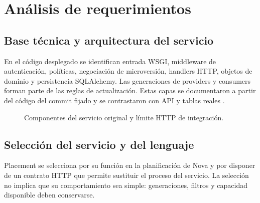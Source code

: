 \documentclass[12pt,a4paper]{article}
\begin{document}
\section{Análisis de requerimientos}
\subsection{Base técnica y arquitectura del servicio}
En el código desplegado se identifican entrada WSGI, middleware de autenticación, políticas, negociación de microversión, handlers HTTP, objetos de dominio y persistencia SQLAlchemy. Las generaciones de providers y consumers forman parte de las reglas de actualización. Estas capas se documentaron a partir del código del commit fijado y se contrastaron con API y tablas reales \cite{repo}.

\begin{figure}[ht]
\centering
{}
\caption{Componentes del servicio original y límite HTTP de integración.}
\end{figure}

\subsection{Selección del servicio y del lenguaje}
Placement se selecciona por su función en la planificación de Nova y por disponer de un contrato HTTP que permite sustituir el proceso del servicio. La selección no implica que su comportamiento sea simple: generaciones, filtros y capacidad disponible deben conservarse.
\end{document}
